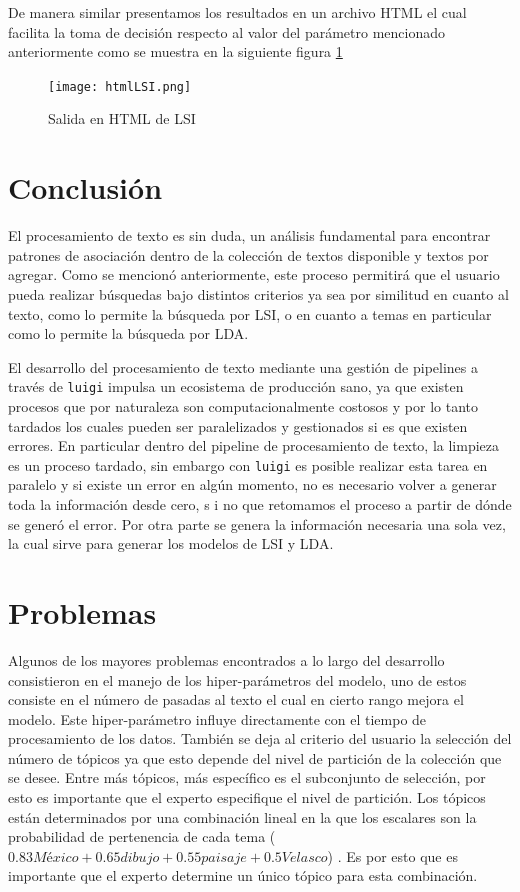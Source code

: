 De manera similar presentamos los resultados en un archivo HTML el cual facilita la toma de decisión respecto al valor del parámetro mencionado anteriormente como se muestra en la siguiente figura \ref{fig:outputLSI}
\vspace{0.2cm}

\begin{figure}[h]\centering
\texttt{[image: htmlLSI.png]}
\caption{Salida en HTML de LSI}
\label{fig:outputLSI}
\end{figure}




\section{Conclusión}
El procesamiento de texto es sin duda, un análisis fundamental para encontrar patrones de asociación dentro de la colección de textos disponible y textos por agregar. Como se mencionó anteriormente, este proceso permitirá que el usuario pueda realizar búsquedas bajo distintos criterios ya sea por similitud en cuanto al texto, como lo permite la búsqueda por LSI, o en cuanto a temas en particular como lo permite la búsqueda por LDA.

El desarrollo del procesamiento de texto mediante una gestión de pipelines a través de \texttt{luigi} impulsa un ecosistema de producción sano, ya que existen procesos que por naturaleza son computacionalmente costosos y por lo tanto tardados los cuales pueden ser paralelizados y gestionados si es que existen errores. 
En particular dentro del pipeline de procesamiento de texto,  la limpieza es un proceso tardado, 
sin embargo con \texttt{luigi} es posible realizar esta tarea en paralelo y si existe un error en algún momento, no es necesario volver a generar toda la información desde cero, s
i no que retomamos el proceso a partir de dónde se generó el error. Por otra parte se genera la información necesaria una sola vez, la cual sirve para generar los modelos de LSI y LDA.

\section{Problemas}

Algunos de los mayores problemas encontrados a lo largo del desarrollo consistieron en el manejo de los hiper-parámetros del modelo, uno de estos consiste en el número de pasadas al texto el cual en cierto rango mejora el modelo. Este hiper-parámetro influye directamente con el tiempo de procesamiento de los datos. También se deja al criterio del usuario la selección del número de tópicos ya que esto depende del nivel de partición de la colección que se desee. Entre más tópicos, más específico es el subconjunto de selección, por esto es importante que el experto especifique el nivel de partición. Los tópicos están determinados por una combinación lineal en la que los escalares son la probabilidad de pertenencia de cada tema ($0.83 México + 0.65 dibujo + 0.55 paisaje + 0.5 Velasco$) . Es por esto que es importante que el experto determine un único tópico para esta combinación.

